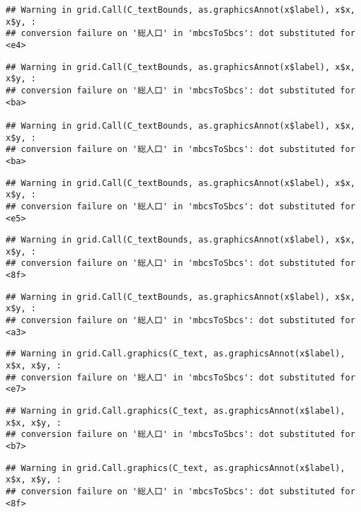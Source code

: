 \documentclass[
]{article}
\begin{document}
\begin{verbatim}
## Warning in grid.Call(C_textBounds, as.graphicsAnnot(x$label), x$x, x$y, :
## conversion failure on '総人口' in 'mbcsToSbcs': dot substituted for <e4>
\end{verbatim}

\begin{verbatim}
## Warning in grid.Call(C_textBounds, as.graphicsAnnot(x$label), x$x, x$y, :
## conversion failure on '総人口' in 'mbcsToSbcs': dot substituted for <ba>

## Warning in grid.Call(C_textBounds, as.graphicsAnnot(x$label), x$x, x$y, :
## conversion failure on '総人口' in 'mbcsToSbcs': dot substituted for <ba>
\end{verbatim}

\begin{verbatim}
## Warning in grid.Call(C_textBounds, as.graphicsAnnot(x$label), x$x, x$y, :
## conversion failure on '総人口' in 'mbcsToSbcs': dot substituted for <e5>
\end{verbatim}

\begin{verbatim}
## Warning in grid.Call(C_textBounds, as.graphicsAnnot(x$label), x$x, x$y, :
## conversion failure on '総人口' in 'mbcsToSbcs': dot substituted for <8f>
\end{verbatim}

\begin{verbatim}
## Warning in grid.Call(C_textBounds, as.graphicsAnnot(x$label), x$x, x$y, :
## conversion failure on '総人口' in 'mbcsToSbcs': dot substituted for <a3>
\end{verbatim}

\begin{verbatim}
## Warning in grid.Call.graphics(C_text, as.graphicsAnnot(x$label), x$x, x$y, :
## conversion failure on '総人口' in 'mbcsToSbcs': dot substituted for <e7>
\end{verbatim}

\begin{verbatim}
## Warning in grid.Call.graphics(C_text, as.graphicsAnnot(x$label), x$x, x$y, :
## conversion failure on '総人口' in 'mbcsToSbcs': dot substituted for <b7>
\end{verbatim}

\begin{verbatim}
## Warning in grid.Call.graphics(C_text, as.graphicsAnnot(x$label), x$x, x$y, :
## conversion failure on '総人口' in 'mbcsToSbcs': dot substituted for <8f>
\end{verbatim}
\end{document}
